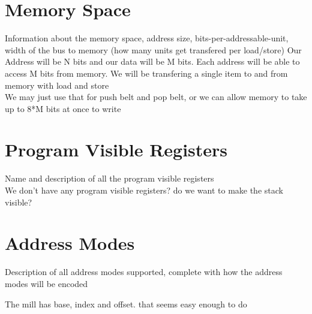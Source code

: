 \documentclass{article}
\begin{document}
\section{Memory Space}
Information about the memory space, address size, bits-per-addressable-unit, width of the bus to memory (how many units get transfered per load/store)
Our Address will be N bits and our data will be M bits.
Each address will be able to access M bits from memory.
We will be transfering a single item to and from memory with load and store\\
We may just use that for push belt and pop belt, or we can allow memory to take up to 8*M bits at once to write

\section{Program Visible Registers}
Name and description of all the program visible registers\\
We don't have any program visible registers? do we want to make the stack visible? 

\section{Address Modes}
Description of all address modes supported, complete with how the address modes will be encoded

The mill has base, index and offset. that seems easy enough to do
\end{document}
